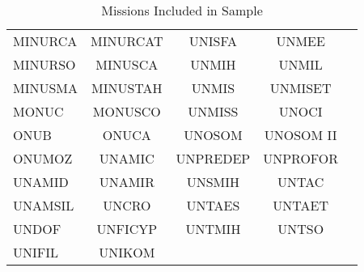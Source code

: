 \begin{table}[htbp!]\centering
\fontsize{12}{12}\selectfont
{\def\sym#1{\ifmmode^{#1}\else\(^{#1}\)\fi}
\caption{Missions Included in Sample \label{Table 4}}
\begin{tabular}{l*{4}{c}}
\hline\hline
MINURCA    &   MINURCAT  &   UNISFA   & UNMEE     \\
[1em]
MINURSO    &   MINUSCA   &   UNMIH    & UNMIL     \\
[1em]
MINUSMA    &   MINUSTAH  &   UNMIS    & UNMISET   \\
[1em]
MONUC      &   MONUSCO   &   UNMISS   & UNOCI     \\
[1em]
ONUB       &   ONUCA     &   UNOSOM   & UNOSOM II \\
[1em]
ONUMOZ     &   UNAMIC    &   UNPREDEP & UNPROFOR  \\
[1em]
UNAMID     &   UNAMIR    &   UNSMIH   & UNTAC     \\
[1em]
UNAMSIL    &   UNCRO     &   UNTAES   & UNTAET    \\
[1em]
UNDOF      &   UNFICYP   &   UNTMIH   & UNTSO     \\
[1em]
UNIFIL     &   UNIKOM    &            &           \\
\hline\hline
\end{tabular}
}
\vspace{-1em}
\end{table}
